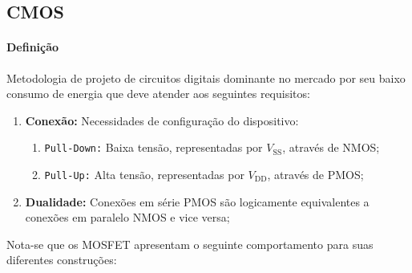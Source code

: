 \documentclass{article}
\begin{document}
        \subsection{CMOS}
            \paragraph{Definição}Metodologia de projeto de circuitos digitais dominante no mercado por seu baixo consumo de energia que deve atender aos seguintes requisitos:
                \begin{enumerate}[rightmargin = \leftmargin]
                    \item \textbf{Conexão:} Necessidades de configuração do dispositivo:
                        \begin{enumerate}[noitemsep]
                            \item \texttt{Pull-Down:} Baixa tensão, representadas por $V_{\text{SS}}$, através de NMOS;
                            \item \texttt{Pull-Up:} Alta tensão, representadas por $V_{\text{DD}}$, através de PMOS;
                        \end{enumerate}
                    \item \textbf{Dualidade:} Conexões em série PMOS são logicamente equivalentes a conexões em paralelo NMOS e vice versa;
                \end{enumerate}
            Nota-se que os MOSFET apresentam o seguinte comportamento para suas diferentes construções:
\end{document}
